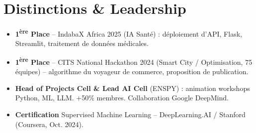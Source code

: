 \documentclass[a4paper,11pt]{article}
\begin{document}
\section{Distinctions \& Leadership}
\begin{itemize}[leftmargin=*, nosep, label=\tiny$\bullet$]
    \item \small{\textbf{1\textsuperscript{ère} Place} -- IndabaX Africa 2025 (IA Santé) : déploiement d'API, Flask, Streamlit, traitement de données médicales.}
    \item \small{\textbf{1\textsuperscript{ère} Place} -- CITS National Hackathon 2024 (Smart City / Optimisation, 75 équipes) -- algorithme du voyageur de commerce, proposition de publication.}
    \item \small{\textbf{Head of Projects Cell \& Lead AI Cell} (ENSPY) : animation workshops Python, ML, LLM. +50\% membres. Collaboration Google DeepMind.}
    \item \small{\textbf{Certification} Supervised Machine Learning -- DeepLearning.AI / Stanford (Coursera, Oct. 2024).}
\end{itemize}
\end{document}
